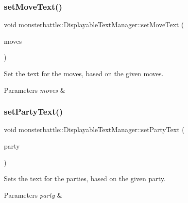 \subsubsection{\texorpdfstring{set\+Move\+Text()}{setMoveText()}}
{\footnotesize\ttfamily void monsterbattle\+::\+Displayable\+Text\+Manager\+::set\+Move\+Text (\begin{DoxyParamCaption}\item[{const std\+::array$<$ const \hyperlink{classmonsterbattle_1_1monster_1_1Move}{monster\+::\+Move} $\ast$, monster\+::\+Monster\+::\+Move\+Count $>$ \&}]{moves }\end{DoxyParamCaption})}



Set the text for the moves, based on the given moves. 


\begin{DoxyParams}{Parameters}
{\em moves} & \\
\hline
\end{DoxyParams}
\mbox{\label{classmonsterbattle_1_1DisplayableTextManager_a610b7a3a16c6fa9d19f9c35fac4953e8}} 
\subsubsection{\texorpdfstring{set\+Party\+Text()}{setPartyText()}}
{\footnotesize\ttfamily void monsterbattle\+::\+Displayable\+Text\+Manager\+::set\+Party\+Text (\begin{DoxyParamCaption}\item[{const std\+::array$<$ std\+::unique\+\_\+ptr$<$ \hyperlink{classmonsterbattle_1_1monster_1_1Monster}{monster\+::\+Monster} $>$, Trainer\+::\+Party\+Count $>$ \&}]{party }\end{DoxyParamCaption})}



Sets the text for the parties, based on the given party. 


\begin{DoxyParams}{Parameters}
{\em party} & \\
\hline
\end{DoxyParams}
\mbox{\label{classmonsterbattle_1_1DisplayableTextManager_aff93a6dbe74f367739c5c8abe56e5f18}} 
